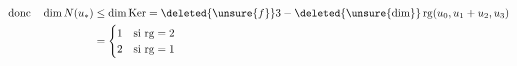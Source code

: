 \[
\begin{aligned}
\text{donc}\quad\dim N(u_*)&\leq\dim\operatorname{Ker}=\deleted{\unsure{f}}3-
\deleted{\unsure{\dim}}\operatorname{rg}(u_0,u_1+u_2,u_3)\\
&=\begin{cases}1&\text{si }\mathrm{rg}=2\\2&\text{si }\mathrm{rg}=1\end{cases}
\end{aligned}
\]

